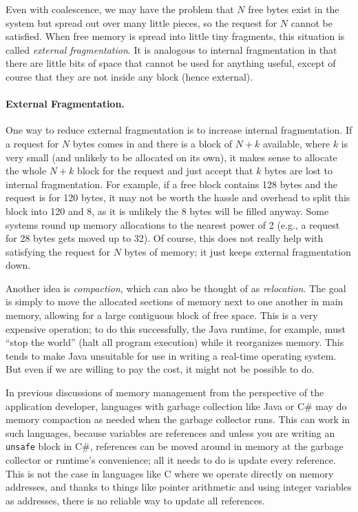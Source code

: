 Even with coalescence, we may have the problem that $N$ free bytes exist in the system but spread out over many little pieces, so the request for $N$ cannot be satisfied. When free memory is spread into little tiny fragments, this situation is called \textit{external fragmentation}. It is analogous to internal fragmentation in that there are little bits of space that cannot be used for anything useful, except of course that they are not inside any block (hence external).

\paragraph{External Fragmentation.}
One way to reduce external fragmentation is to increase internal fragmentation. If a request for $N$ bytes comes in and there is a block of $N+k$ available, where $k$ is very small (and unlikely to be allocated on its own), it makes sense to allocate the whole $N+k$ block for the request and just accept that $k$ bytes are lost to internal fragmentation. For example, if a free block contains 128 bytes and the request is for 120 bytes, it may not be worth the hassle and overhead to split this block into 120 and 8, as it is unlikely the 8 bytes will be filled anyway. Some systems round up memory allocations to the nearest power of 2 (e.g., a request for 28 bytes gets moved up to 32). Of course, this does not really help with satisfying the request for $N$ bytes of memory; it just keeps external fragmentation down.

Another idea is \textit{compaction}, which can also be thought of as \textit{relocation}. The goal is simply to move the allocated sections of memory next to one another in main memory, allowing for a large contiguous block of free space. This is a very expensive operation; to do this successfully, the Java runtime, for example, must ``stop the world'' (halt all program execution) while it reorganizes memory. This tends to make Java unsuitable for use in writing a real-time operating system. But even if we are willing to pay the cost, it might not be possible to do.

In previous discussions of memory management from the perspective of the application developer, languages with garbage collection like Java or C\# may do memory compaction as needed when the garbage collector runs. This can work in such languages, because variables are references and unless you are writing an \texttt{unsafe} block in C\#, references can be moved around in memory at the garbage collector or runtime's convenience; all it needs to do is update every reference. This is not the case in languages like C where we operate directly on memory addresses, and thanks to things like pointer arithmetic and using integer variables as addresses, there is no reliable way to update all references. 

